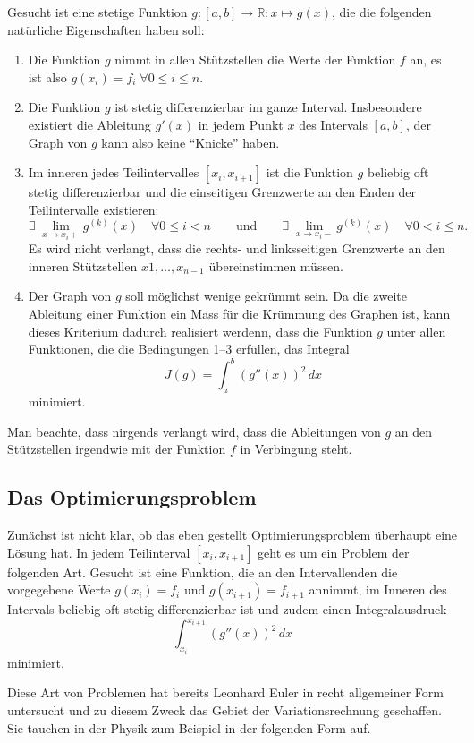 Gesucht ist eine stetige Funktion $g\colon[a,b]\to\mathbb R:x\mapsto g(x)$,
die die folgenden natürliche Eigenschaften haben soll:
\begin{enumerate}
\item
Die Funktion $g$ nimmt in allen Stützstellen die Werte der Funktion
$f$ an, es ist also $g(x_i)=f_i\;\forall 0\le i\le n$.
\item
Die Funktion $g$ ist stetig differenzierbar im ganze Interval.
Insbesondere existiert die Ableitung $g'(x)$ in jedem Punkt $x$ des
Intervals $[a,b]$, der Graph von $g$ kann also keine ``Knicke'' haben.
\item
Im inneren jedes Teilintervalles $[x_i,x_{i+1}]$ ist die Funktion $g$
beliebig oft stetig differenzierbar und die einseitigen Grenzwerte 
an den Enden der Teilintervalle existieren:
\[
\exists\; \lim_{x\to x_i+} g^{(k)}(x) \quad\forall 0\le i < n
\qquad\text{und}\qquad
\exists\; \lim_{x\to x_i-} g^{(k)}(x) \quad\forall 0< i \le n.
\]
Es wird nicht verlangt, dass die rechts- und linksseitigen Grenzwerte
an den inneren Stützstellen $x1,\dots,x_{n-1}$ übereinstimmen müssen.
\item
Der Graph von $g$ soll möglichst wenige gekrümmt sein.
Da die zweite Ableitung einer Funktion ein Mass für die Krümmung des 
Graphen ist, kann dieses Kriterium dadurch realisiert werdenn, dass
die Funktion $g$ unter allen Funktionen, die die Bedingungen 1--3 erfüllen,
das Integral
\[
J(g)
=
\int_a^b (g''(x) )^2\,dx
\]
minimiert.
\end{enumerate}

Man beachte, dass nirgends verlangt wird, dass die Ableitungen von $g$
an den Stützstellen irgendwie mit der Funktion $f$ in Verbingung steht.

%
%
\subsection{Das Optimierungsproblem
\label{buch:subsection:variation}}
Zunächst ist nicht klar, ob das eben gestellt Optimierungsproblem überhaupt
eine Lösung hat. 
In jedem Teilinterval $[x_i,x_{i+1}]$ geht es um ein Problem der
folgenden Art.
Gesucht ist eine Funktion, die an den Intervallenden die vorgegebene
Werte $g(x_i)=f_i$ und $g(x_{i+1})=f_{i+1}$ annimmt, im Inneren des
Intervals beliebig oft stetig differenzierbar ist und zudem einen
Integralausdruck
\[
\int_{x_i}^{x_{i+1}} (g''(x))^2\,dx
\]
minimiert.

Diese Art von Problemen hat bereits Leonhard Euler in recht allgemeiner
Form untersucht und zu diesem Zweck das Gebiet der Variationsrechnung
geschaffen.
Sie tauchen in der Physik zum Beispiel in der folgenden Form auf.

